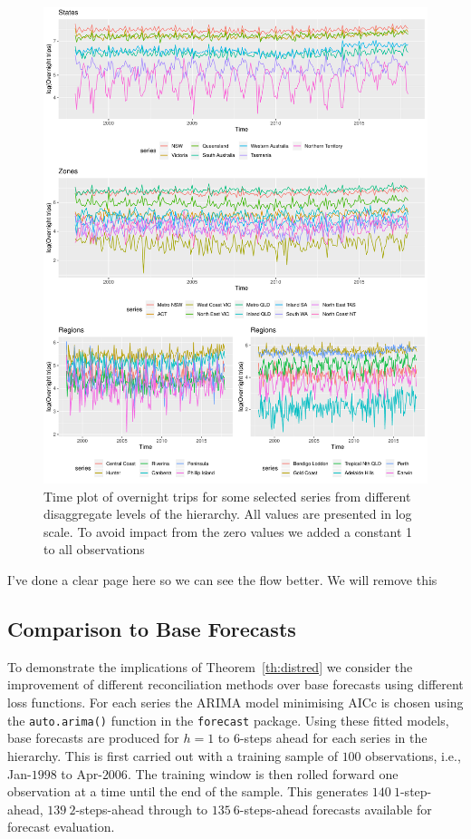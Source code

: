 \documentclass[12pt]{article}
\theoremstyle{definition}
\begin{document}
\begin{figure}
  \centering
  \small
  \includegraphics[width= .95\textwidth]{Empirical-results/TS-plots/States_Zones_Regs_TSplots1.pdf}
  \caption{Time plot of overnight trips for some selected series from different disaggregate levels of the hierarchy. All values are presented in log scale. To avoid impact from the zero values we added a constant 1 to all observations}\label{fig:States_Zones_Regs_TSplots}
\end{figure}

\clearpage

{\color{red} I've done a clear page here so we can see the flow better. We will remove this}


\subsection*{Comparison to Base Forecasts}\label{sec:comparebase}

To demonstrate the implications of Theorem~\ref{th:distred} we consider the improvement of different reconciliation methods over base forecasts {\color{blue} using different loss functions}. For each series the ARIMA model minimising AICc is chosen using the \verb|auto.arima()| function in the \verb|forecast| package. Using these fitted models, base forecasts are produced for $h=1$ to $6$-steps ahead for each series in the hierarchy. This is first carried out with a training sample of $100$ observations, i.e., Jan-$1998$ to Apr-$2006$. The training window is then rolled forward one observation at a time until the end of the sample. This generates $140~1$-step-ahead, $139~2$-steps-ahead through to $135~6$-steps-ahead forecasts available for forecast evaluation.
\end{document}
